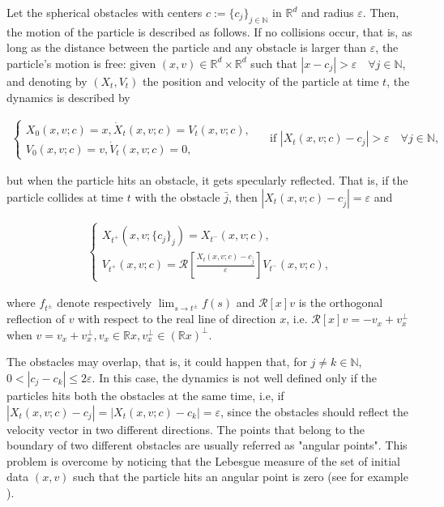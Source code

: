 \documentclass[a4paper,10pt,reqno]{amsart}
\numberwithin{equation}{subsection}
\numberwithin{figure}{subsection}
\begin{document}
Let the spherical obstacles with centers $c:=\{c_j\}_{j\in\mathbb{N}}$ in $\mathbb{R}^d$ and radius $\varepsilon$. Then, the motion of the particle is described as follows. If no collisions occur, that is, as long as the distance between the particle and any obstacle is larger than $\varepsilon$, the particle's motion is free: given $(x,v)\in\mathbb{R}^d\times\mathbb{R}^d$ such that $|x-c_j|>\varepsilon\quad\forall j\in\mathbb{N}$, and denoting by $(X_t,V_t)$ the position and velocity of the particle at time $t$, the dynamics is described by

{\small\begin{align}\label{motolibero}
\left\{\begin{array}{lcr}X_0(x,v;c)=x, \dot X_t(x,v;c)=V_t(x,v;c),\\V_0(x,v;c)=v,\dot V_t(x,v;c)=0,\end{array}\right.\quad\textrm{ if }|X_t(x,v;c)-c_j|>\varepsilon\quad\forall j\in\mathbb{N},
\end{align}}

but when the particle hits an obstacle, it gets specularly reflected. That is, if the particle collides at time $t$ with the obstacle $\bar j$, then $|X_t(x,v;c)-c_{\bar j}|=\varepsilon$ and 

\begin{align}\label{motourto}
\left\{\begin{array}{lcr}X_{t^+}(x,v;\{c_j\}_j)=X_{t^-}(x,v;c),\\V_{t^+}(x,v;c)={\mathcal R}\left[\frac{X_t(x,v;c)-c_{\bar j}}{\varepsilon}\right]V_{t^-}(x,v;c),\end{array}\right.
\end{align}

where $f_{t^{\pm}}$ denote respectively $\lim_{s\to t^{\pm}}f(s)$ and ${\mathcal R}[x]v$ is the orthogonal reflection of $v$ with respect to the real line of direction $x$, i.e. ${\mathcal R}[x]v=-v_x+v_x^{\perp}$ when $v=v_x+v_x^{\perp},v_x\in\mathbb{R}x,v_x^{\perp}\in(\mathbb{R}x)^{\perp}$.

The obstacles may overlap, that is, it could happen that, for $j\neq k\in\mathbb{N}$, $0<|c_j-c_k|\leq2\varepsilon$. In this case, the dynamics is not well defined only if the particles hits both the obstacles at the same time, i.e, if $|X_t(x,v;c)-c_j|=|X_t(x,v;c)-c_k|=\varepsilon$, since the obstacles should reflect the velocity vector in two different directions. The points that belong to the boundary of two different obstacles are usually referred as "angular points". This problem is overcome by noticing that the Lebesgue measure of the set of initial data $(x,v)$ such that the particle hits an angular point is zero (see for example \cite{BBS1983}).
\end{document}
